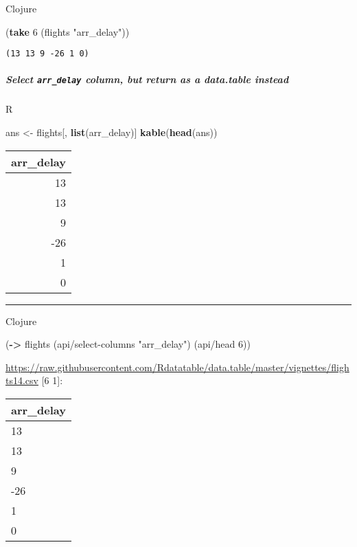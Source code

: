 \documentclass[]{article}
\newenvironment{Shaded}{\begin{snugshade}}{\end{snugshade}}
\newcommand{\KeywordTok}[1]{\textcolor[rgb]{0.13,0.29,0.53}{\textbf{#1}}}
\newcommand{\DecValTok}[1]{\textcolor[rgb]{0.00,0.00,0.81}{#1}}
\newcommand{\StringTok}[1]{\textcolor[rgb]{0.31,0.60,0.02}{#1}}
\newcommand{\NormalTok}[1]{#1}
\let\oldsubparagraph\subparagraph
\renewcommand{\subparagraph}[1]{\oldsubparagraph{#1}\mbox{}}
\begin{document}
Clojure

\begin{Shaded}
\begin{Highlighting}[]
\NormalTok{(}\KeywordTok{take} \DecValTok{6}\NormalTok{ (flights }\StringTok{"arr_delay"}\NormalTok{))}
\end{Highlighting}
\end{Shaded}

\begin{verbatim}
(13 13 9 -26 1 0)
\end{verbatim}

\subparagraph{\texorpdfstring{Select \texttt{arr\_delay} column, but
return as a data.table
instead}{Select arr\_delay column, but return as a data.table instead}}\label{select-arr_delay-column-but-return-as-a-data.table-instead}

R

\begin{Shaded}
\begin{Highlighting}[]
\NormalTok{ans <-}\StringTok{ }\NormalTok{flights[, }\KeywordTok{list}\NormalTok{(arr_delay)]}
\KeywordTok{kable}\NormalTok{(}\KeywordTok{head}\NormalTok{(ans))}
\end{Highlighting}
\end{Shaded}

\begin{longtable}[]{@{}r@{}}
\toprule
arr\_delay\tabularnewline
\midrule
\endhead
13\tabularnewline
13\tabularnewline
9\tabularnewline
-26\tabularnewline
1\tabularnewline
0\tabularnewline
\bottomrule
\end{longtable}

\begin{center}\rule{0.5\linewidth}{0.5pt}\end{center}

Clojure

\begin{Shaded}
\begin{Highlighting}[]
\NormalTok{(}\KeywordTok{->}\NormalTok{ flights}
\NormalTok{    (api/select-columns }\StringTok{"arr_delay"}\NormalTok{)}
\NormalTok{    (api/head }\DecValTok{6}\NormalTok{))}
\end{Highlighting}
\end{Shaded}

\url{https://raw.githubusercontent.com/Rdatatable/data.table/master/vignettes/flights14.csv}
{[}6 1{]}:

\begin{longtable}[]{@{}l@{}}
\toprule
arr\_delay\tabularnewline
\midrule
\endhead
13\tabularnewline
13\tabularnewline
9\tabularnewline
-26\tabularnewline
1\tabularnewline
0\tabularnewline
\bottomrule
\end{longtable}
\end{document}
